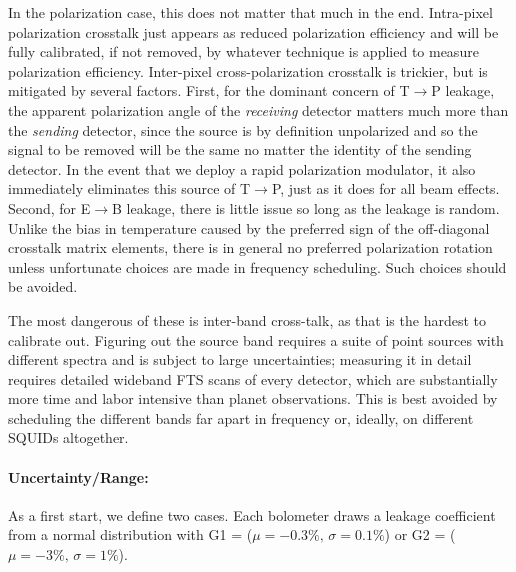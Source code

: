 In the polarization case, this does not matter that much in the end.
Intra-pixel polarization crosstalk just appears as reduced polarization efficiency and will be fully calibrated, if not removed, by whatever technique is applied to measure polarization efficiency.
Inter-pixel cross-polarization crosstalk is trickier, but is mitigated by several factors.
First, for the dominant concern of T$\rightarrow$P leakage, the apparent polarization angle of the \emph{receiving} detector matters much more than the \emph{sending} detector, since the source is by definition unpolarized and so the signal to be removed will be the same no matter the identity of the sending detector.
In the event that we deploy a rapid polarization modulator, it also immediately eliminates this source of T$\rightarrow$P, just as it does for all beam effects.
Second, for E$\rightarrow$B leakage, there is little issue so long as the leakage is random.
Unlike the bias in temperature caused by the preferred sign of the off-diagonal crosstalk matrix elements, there is in general no preferred polarization rotation unless unfortunate choices are made in frequency scheduling.
Such choices should be avoided.

The most dangerous of these is inter-band cross-talk, as that is the hardest to calibrate out.
Figuring out the source band requires a suite of point sources with different spectra and is subject to large uncertainties; measuring it in detail requires detailed wideband FTS scans of every detector, which are substantially more time and labor intensive than planet observations.
This is best avoided by scheduling the different bands far apart in frequency or, ideally, on different SQUIDs altogether.

\paragraph{Uncertainty/Range:}
As a first start, we define two cases.
Each bolometer draws a leakage coefficient from a normal distribution with G1 = ($\mu=-0.3\%,\, \sigma=0.1\%$) or G2 = ($\mu=-3\%,\, \sigma=1\%$).
